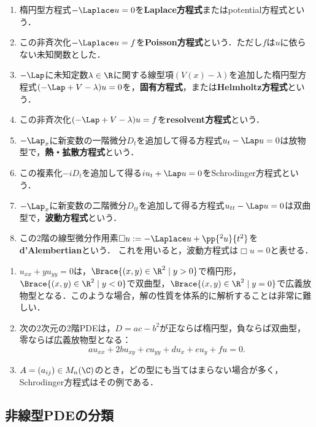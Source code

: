 \documentclass[uplatex,dvipdfmx]{jsreport}
\begin{document}
\begin{definition}\mbox{}
    \begin{enumerate}
        \item 楕円型方程式$-\Laplace u=0$を\textbf{Laplace方程式}またはpotential方程式という．
        \item この非斉次化$-\Laplace u=f$を\textbf{Poisson方程式}という．ただし$f$は$u$に依らない未知関数とした．
        \item $-\Lap$に未知定数$\lambda\in\R$に関する線型項$(V(x)-\lambda)$を追加した楕円型方程式$(-\Lap+V-\lambda)u=0$を，\textbf{固有方程式}，または\textbf{Helmholtz方程式}という．
        \item この非斉次化$(-\Lap+V-\lambda)u=f$を\textbf{resolvent方程式}という．
        \item $-\Lap_x$に新変数の一階微分$D_t$を追加して得る方程式$u_t-\Lap u=0$は放物型で，\textbf{熱・拡散方程式}という．
        \item この複素化$-iD_t$を追加して得る$iu_t+\Lap u=0$をSchrodinger方程式という．
        \item $-\Lap_x$に新変数の二階微分$D_{tt}$を追加して得る方程式$u_{tt}-\Lap u=0$は双曲型で，\textbf{波動方程式}という．
        \item この2階の線型微分作用素$\Box u:= -\Laplace u+\pp{^2u}{t^2}$を\textbf{d'Alembertian}という．
        これを用いると，波動方程式は$\Box u=0$と表せる．
    \end{enumerate}
\end{definition}

\begin{example}\mbox{}
    \begin{enumerate}
        \item $u_{xx}+yu_{yy}=0$は，$\Brace{(x,y)\in\R^2\mid y>0}$で楕円形，$\Brace{(x,y)\in\R^2\mid y<0}$で双曲型，$\Brace{(x,y)\in\R^2\mid y=0}$で広義放物型となる．このような場合，解の性質を体系的に解析することは非常に難しい．
        \item 次の2次元の2階PDEは，$D=ac-b^2$が正ならば楕円型，負ならば双曲型，零ならば広義放物型となる：
        \[au_{xx}+2bu_{xy}+cu_{yy}+du_x+eu_y+fu=0.\]
        \item $A=(a_{ij})\in M_n(\C)$のとき，どの型にも当てはまらない場合が多く，Schrodinger方程式はその例である．
    \end{enumerate}
\end{example}

\subsection{非線型PDEの分類}
\end{document}
